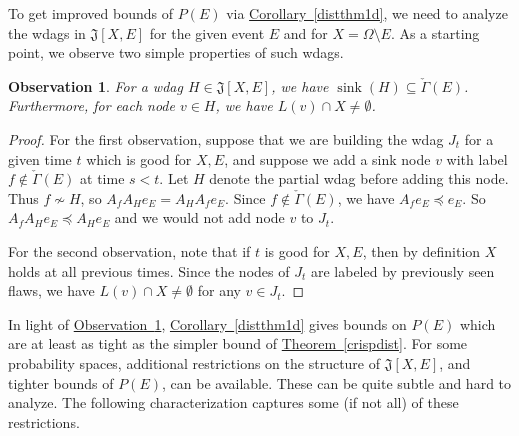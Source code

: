 \documentclass[11pt]{article}
\newcommand{\expref}[2]{\texorpdfstring{\hyperref[#2]{#1~\ref{#2}}}{#1~\ref{#2}}}
\DeclareMathOperator{\sink}{sink}
\newtheorem{observation}[theorem]{Observation}
\begin{document}
To get improved bounds of $P(E)$ via \expref{Corollary}{distthm1d}, we need to analyze the wdags in $\mathfrak J[X, E]$ for the given event $E$ and for $X = \Omega \setminus E$. As a starting point, we observe two simple properties of such wdags.
\begin{observation}
\label{character-prop0}
For a wdag $H \in \mathfrak J[X,E]$, we have $\sink(H) \subseteq \check \Gamma(E)$. Furthermore, for each node $v \in H$, we have $L(v) \cap X \neq \emptyset$.
\end{observation}
\begin{proof}
For the first observation, suppose that we are building the wdag $J_t$ for a given time $t$ which is good for $X,E$, and suppose we add a sink node $v$ with label $f \notin \check \Gamma(E)$ at time $s < t$. Let $H$ denote the partial wdag before adding this node. Thus $f \not \sim H$, so $A_f A_H e_E = A_H A_f e_E$. Since $f \notin \check \Gamma(E)$, we have $A_f e_E \preceq e_E$. So $A_f A_H e_E \preceq A_H e_E$ and we would not add node $v$ to $J_t$.

For the second observation, note that if $t$ is good for $X, E$,  then by definition $X$ holds at all previous times. Since the nodes of $J_t$ are labeled by previously seen flaws, we have $L(v) \cap  X \neq \emptyset$ for any $v \in J_t$.
\end{proof}

In light of \expref{Observation}{character-prop0},  \expref{Corollary}{distthm1d} gives bounds on $P(E)$ which are at least as tight as the simpler bound of \expref{Theorem}{crispdist}.  For some probability spaces, additional restrictions on the structure of $\mathfrak J[X,E]$, and tighter bounds of $P(E)$, can be available. These can be quite subtle and hard to analyze. The following characterization captures some (if not all) of these restrictions.  
\end{document}
